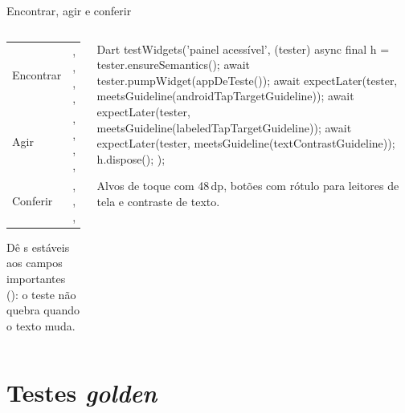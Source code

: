 \documentclass[aspectratio=169,10pt]{beamer}
\begin{document}
\begin{frame}[fragile]{Encontrar, agir e conferir}
  \begin{columns}[T]
    \begin{column}{0.5\textwidth}
      \scriptsize
      \begin{tabularx}{\linewidth}{@{}l L@{}}
        \toprule
         &  \\
        \midrule
        Encontrar & , , , ,  \\
        Agir & , , , ,  \\
        Conferir & , , ,  \\
        \bottomrule
      \end{tabularx}
      \begin{dica}
        Dê s estáveis aos campos importantes (): o teste não quebra quando o texto muda.
      \end{dica}
    \end{column}
    \begin{column}{0.48\textwidth}
\begin{codigo}[title=Acessibilidade automática]{Dart}
testWidgets('painel acessível', (tester) async {
  final h = tester.ensureSemantics();
  await tester.pumpWidget(appDeTeste());
  await expectLater(tester,
      meetsGuideline(androidTapTargetGuideline));
  await expectLater(tester,
      meetsGuideline(labeledTapTargetGuideline));
  await expectLater(tester,
      meetsGuideline(textContrastGuideline));
  h.dispose();
});
\end{codigo}
      \begin{conceito}
        Alvos de toque com 48\,dp, botões com rótulo para leitores de tela e contraste de texto.
      \end{conceito}
    \end{column}
  \end{columns}
\end{frame}

\section{Testes \emph{golden}}
\end{document}
